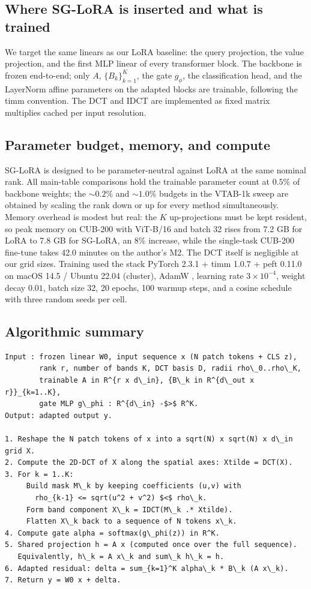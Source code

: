 \documentclass{article}
\begin{document}
\subsection{Where SG-LoRA is inserted and what is trained}

We target the same linears as our LoRA baseline: the query projection,
the value projection, and the first MLP linear of every transformer
block. The backbone is frozen end-to-end; only $A$, $\{B_k\}_{k=1}^{K}$,
the gate $g_\phi$, the classification head, and the LayerNorm affine
parameters on the adapted blocks are trainable, following the timm
convention. The DCT and IDCT are implemented as fixed matrix multiplies
cached per input resolution.

\subsection{Parameter budget, memory, and compute}

SG-LoRA is designed to be parameter-neutral against LoRA at the same
nominal rank. All main-table comparisons hold the trainable parameter
count at $0.5\%$ of backbone weights; the $\sim0.2\%$ and $\sim1.0\%$
budgets in the VTAB-1k sweep are obtained by scaling the rank down or
up for every method simultaneously. Memory overhead is modest but
real: the $K$ up-projections must be kept resident, so peak memory on
CUB-200 with ViT-B/16 and batch 32 rises from 7.2 GB for LoRA to 7.8 GB
for SG-LoRA, an 8\% increase, while the single-task CUB-200 fine-tune
takes 42.0 minutes on the author's M2. The DCT itself is negligible at
our grid sizes. Training used the stack
PyTorch 2.3.1 + timm 1.0.7 + peft 0.11.0 on
macOS 14.5 / Ubuntu 22.04 (cluster), AdamW
\citep{loshchilov2019adamw, kingma2015adam}, learning rate
$3\times 10^{-4}$, weight decay $0.01$, batch size 32, 20 epochs, 100
warmup steps, and a cosine schedule with three random seeds per cell.

\subsection{Algorithmic summary}

\begin{verbatim}
Input : frozen linear W0, input sequence x (N patch tokens + CLS z),
        rank r, number of bands K, DCT basis D, radii rho\_0..rho\_K,
        trainable A in R^{r x d\_in}, {B\_k in R^{d\_out x r}}_{k=1..K},
        gate MLP g\_phi : R^{d\_in} -$>$ R^K.
Output: adapted output y.

1. Reshape the N patch tokens of x into a sqrt(N) x sqrt(N) x d\_in grid X.
2. Compute the 2D-DCT of X along the spatial axes: Xtilde = DCT(X).
3. For k = 1..K:
     Build mask M\_k by keeping coefficients (u,v) with
       rho_{k-1} <= sqrt(u^2 + v^2) $<$ rho\_k.
     Form band component X\_k = IDCT(M\_k .* Xtilde).
     Flatten X\_k back to a sequence of N tokens x\_k.
4. Compute gate alpha = softmax(g\_phi(z)) in R^K.
5. Shared projection h = A x (computed once over the full sequence).
   Equivalently, h\_k = A x\_k and sum\_k h\_k = h.
6. Adapted residual: delta = sum_{k=1}^K alpha\_k * B\_k (A x\_k).
7. Return y = W0 x + delta.
\end{verbatim}
\end{document}
